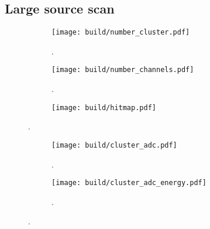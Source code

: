 \subsection{Large source scan}
\label{sec:large_q}

\begin{figure}
    \centering
    \begin{subfigure}{0.49\textwidth}
      \texttt{[image: build/number\_cluster.pdf]}
      \caption{.}
      \label{fig:x}
    \end{subfigure}
    \hfill
    \begin{subfigure}{0.49\textwidth}
      \texttt{[image: build/number\_channels.pdf]}
      \caption{.}
      \label{fig:y}
    \end{subfigure}
    \vfill
    \begin{subfigure}{0.49\textwidth}
        \texttt{[image: build/hitmap.pdf]}
        \caption{}
        \label{fig:z}
      \end{subfigure}
    \caption{.}
    \label{fig:xyz}
  \end{figure}

  \begin{figure}
    \centering
    \begin{subfigure}{0.49\textwidth}
        \texttt{[image: build/cluster\_adc.pdf]}
        \caption{.}
        \label{fig:a}
    \end{subfigure}
    \hfill
    \begin{subfigure}{0.49\textwidth}
        \texttt{[image: build/cluster\_adc\_energy.pdf]}
        \caption{.}
        \label{fig:b}
    \end{subfigure}
    \caption{.}
    \label{fig:ab}
\end{figure}

